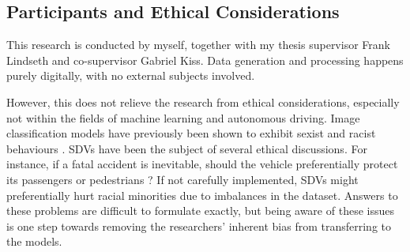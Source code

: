 \subsection*{Participants and Ethical Considerations}

This research is conducted by myself,
together with my thesis supervisor Frank Lindseth and co-supervisor Gabriel Kiss.
Data generation and processing happens purely digitally,
with no external subjects involved.

However, this does not relieve the research from ethical considerations,
especially not within the fields of machine learning and autonomous driving.
Image classification models have previously been shown to exhibit
sexist and racist behaviours \cite{yapo2018ethical}.
SDVs have been the subject of several ethical discussions.
For instance, if a fatal accident is inevitable,
should the vehicle preferentially protect its passengers or pedestrians \cite{Contissa2017}? 
If not carefully implemented,
SDVs might preferentially hurt racial minorities due to imbalances in the dataset.
Answers to these problems are difficult to formulate exactly,
but being aware of these issues is one step towards removing the researchers' inherent bias from transferring to the models.
